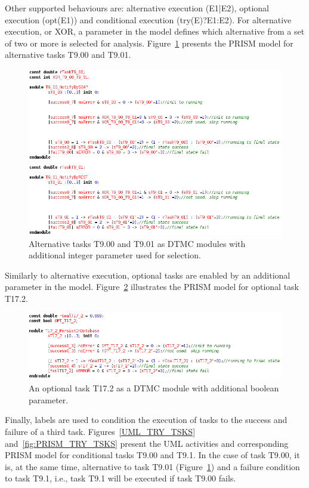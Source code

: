 Other supported behaviours are: alternative execution (E1|E2), optional execution (opt(E1)) and conditional execution (try(E)?E1:E2). For alternative execution, or XOR, a parameter in the model defines which alternative from a set of two or more is selected for analysis. Figure~\ref{fig:PRISM_ALT_TSKS} presents the PRISM model for alternative tasks T9.00 and T9.01.

\begin{figure}[ht!]
\centering
\includegraphics[width=1\textwidth]{imgs/PRISM_ALT_TSKS.png}
\caption{Alternative tasks T9.00 and T9.01 as DTMC modules with additional integer parameter used for selection.}
\label{fig:PRISM_ALT_TSKS}
\end{figure}

Similarly to alternative execution, optional tasks are enabled by an additional parameter in the model. Figure~\ref{fig:PRISM_OPT_TSK} illustrates the PRISM model for optional task T17.2.

\begin{figure}[ht!]
\centering
\includegraphics[width=1\textwidth]{imgs/PRISM_OPT_TSK.png}
\caption{An optional task T17.2 as a DTMC module with additional boolean parameter.}
\label{fig:PRISM_OPT_TSK}
\end{figure}

Finally, labels are used to condition the execution of tasks to the success and failure of a third task. Figures~\ref{UML_TRY_TSKS} and~\ref{fig:PRISM_TRY_TSKS} present the UML activities and corresponding PRISM model for conditional tasks T9.00 and T9.1. In the case of task T9.00, it is, at the same time, alternative to task T9.01 (Figure~\ref{fig:PRISM_ALT_TSKS}) and a failure condition to task T9.1, i.e., task T9.1 will be executed if task T9.00 fails.

